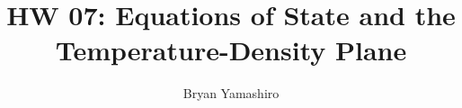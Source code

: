 \documentclass[onecolumn]{aastex6}
\begin{document}

\title{HW 07: Equations of State and the Temperature-Density Plane}


\author{Bryan Yamashiro}






\end{document}
